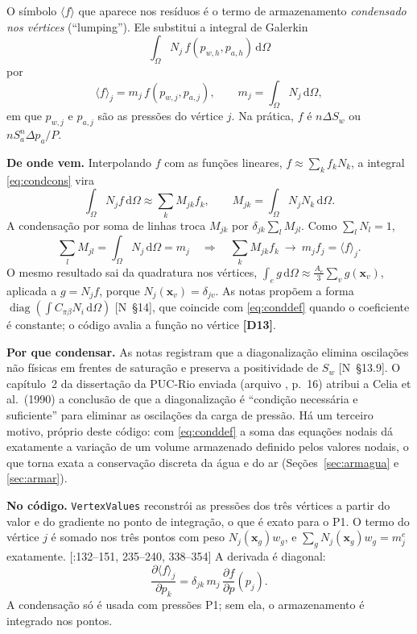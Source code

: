 \documentclass[11pt,a4paper]{article}
\numberwithin{equation}{section}
\newcommand{\dd}{\mathrm{d}}
\newcommand{\pabs}{P}
\newcommand{\code}[1]{\texttt{#1}}
\newcommand{\cond}[1]{\big\langle #1\big\rangle}
\newcommand{\nota}[1]{{\footnotesize\textsf{[N~#1]}}}
\newcommand{\loc}[2]{{\footnotesize[\path{#1}:#2]}}
\newcommand{\disc}[1]{\textcolor{red!70!black}{\textbf{\footnotesize[#1]}}}
\begin{document}
O símbolo $\cond{f}$ que aparece nos resíduos é o termo de armazenamento \emph{condensado nos vértices} (``lumping'').
Ele substitui a integral de Galerkin
\begin{equation}
\int_\Omega N_j\,f(p_{w,h},p_{a,h})\,\dd\Omega
\label{eq:condcons}
\end{equation}
por
\begin{equation}
\boxed{\cond{f}_j=m_j\,f(p_{w,j},p_{a,j}),\qquad m_j=\int_\Omega N_j\,\dd\Omega,}
\label{eq:conddef}
\end{equation}
em que $p_{w,j}$ e $p_{a,j}$ são as pressões do vértice $j$. Na prática, $f$ é $n\Delta S_w$ ou
$nS_a^n\Delta p_a/\pabs$.

\textbf{De onde vem.} Interpolando $f$ com as funções lineares, $f\approx\sum_kf_kN_k$, a integral
\eqref{eq:condcons} vira
\begin{equation}
\int_\Omega N_jf\,\dd\Omega\approx\sum_kM_{jk}f_k,\qquad M_{jk}=\int_\Omega N_jN_k\,\dd\Omega .
\label{eq:condM}
\end{equation}
A condensação por soma de linhas troca $M_{jk}$ por $\delta_{jk}\sum_lM_{jl}$. Como $\sum_lN_l=1$,
\begin{equation}
\sum_lM_{jl}=\int_\Omega N_j\,\dd\Omega=m_j\quad\Longrightarrow\quad \sum_kM_{jk}f_k\ \to\ m_jf_j=\cond{f}_j .
\label{eq:condrow}
\end{equation}
O mesmo resultado sai da quadratura nos vértices, $\int_eg\,\dd\Omega\approx\tfrac{A_e}{3}\sum_vg(\mathbf x_v)$, aplicada a
$g=N_jf$, porque $N_j(\mathbf x_v)=\delta_{jv}$. As notas propõem a forma
$\operatorname{diag}(\int C_{\pi\beta}N_i\,\dd\Omega)$ \nota{§14}, que coincide com \eqref{eq:conddef} quando o coeficiente é
constante; o código avalia a função no vértice \disc{D13}.

\textbf{Por que condensar.} As notas registram que a diagonalização elimina oscilações não físicas em frentes de
saturação e preserva a positividade de $S_w$ \nota{§13.9}. O capítulo~2 da dissertação da PUC-Rio enviada (arquivo
, p.~16) atribui a Celia et al.\ (1990) a conclusão de que a diagonalização é ``condição necessária e
suficiente'' para eliminar as oscilações da carga de pressão. Há um terceiro motivo, próprio deste código: com
\eqref{eq:conddef} a soma das equações nodais dá exatamente a variação de um volume armazenado definido pelos valores
nodais, o que torna exata a conservação discreta da água e do ar (Seções~\ref{sec:armagua} e \ref{sec:armar}).

\textbf{No código.} \code{VertexValues} reconstrói as pressões dos três vértices a partir do valor e do gradiente no ponto
de integração, o que é exato para o P1. O termo do vértice $j$ é somado nos três pontos com peso $N_j(\mathbf x_g)w_g$, e
$\sum_gN_j(\mathbf x_g)w_g=m_j^e$ exatamente.
\loc{TPZMatUnsaturatedUPwPa.cpp}{132--151, 235--240, 338--354} A derivada é diagonal:
\begin{equation}
\frac{\partial\cond{f}_j}{\partial p_k}=\delta_{jk}\,m_j\,\frac{\partial f}{\partial p}(p_j).
\label{eq:condder}
\end{equation}
A condensação só é usada com pressões P1; sem ela, o armazenamento é integrado nos pontos.
\end{document}
